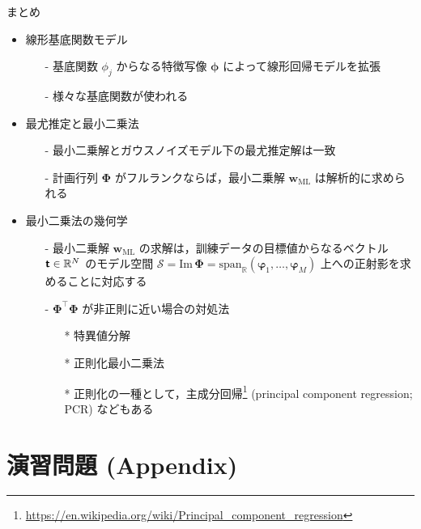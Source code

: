\documentclass[uplatex,11pt,dvipdfmx,aspectratio=169,unicode,t]{beamer}
\numberwithin{equation}{section}
\newcommand{\BR}{\mathbb{R}}
\newcommand{\CS}{\mathcal{S}}
\newcommand{\tb}[1]{\textbf{#1}}
\newcommand{\ts}[1]{\textsf{#1}}
\newcommand{\bs}[1]{\boldsymbol{#1}}
\newcommand{\1}{\bs{1}}
\newcommand{\0}{\bs{0}}
\begin{document}
\begin{frame}{まとめ}
    \begin{itemize}
        \item 線形基底関数モデル
        \begin{itemize}
            \item[-] 基底関数 $\phi_{j}$ からなる特徴写像 $\bs{\phi}$ によって線形回帰モデルを拡張
            \item[-] 様々な基底関数が使われる
        \end{itemize}
        \item 最尤推定と最小二乗法
        \begin{itemize}
            \item[-] 最小二乗解とガウスノイズモデル下の最尤推定解は一致
            \item[-] 計画行列 $\bs{\Phi}$ がフルランクならば，最小二乗解 $\bs{w}_{\text{ML}}$ は解析的に求められる
        \end{itemize}
        \item 最小二乗法の幾何学
        \begin{itemize}
            \item[-] 最小二乗解 $\bs{w}_{\text{ML}}$ の求解は，訓練データの目標値からなるベクトル $\tb{\ts{t}} \in \BR^{N}$ のモデル空間 $\CS = \text{Im}\, \bs{\Phi} = \text{span}_{\BR}(\bs{\varphi}_{1},\ldots,\bs{\varphi}_{M})$ 上への正射影を求めることに対応する
            \item[-] $\bs{\Phi}^{\top} \bs{\Phi}$ が非正則に近い場合の対処法
            \begin{itemize}
                \item[*] 特異値分解
                \item[*] 正則化最小二乗法
                \item[*] 正則化の一種として，主成分回帰\footnote{\url{https://en.wikipedia.org/wiki/Principal_component_regression}} (principal component regression; PCR) などもある
            \end{itemize}
        \end{itemize}
    \end{itemize}
\end{frame}

\section{演習問題 (Appendix)}
\end{document}
